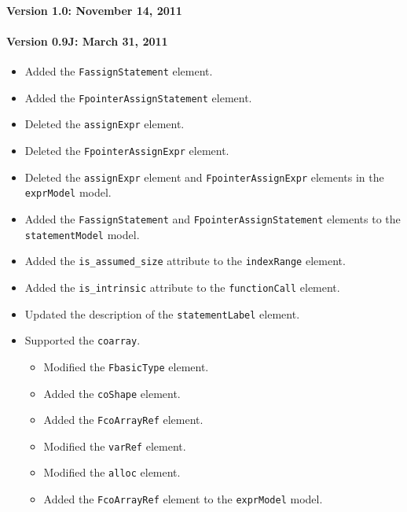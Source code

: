 \paragraph*{Version 1.0: November 14, 2011}

\paragraph*{Version 0.9J: March 31, 2011}

\begin{itemize}
  \item Added the {\tt FassignStatement} element.
  \item Added the {\tt FpointerAssignStatement} element.
  \item Deleted the {\tt assignExpr} element.
  \item Deleted the {\tt FpointerAssignExpr} element.
  \item Deleted the {\tt assignExpr} element and {\tt FpointerAssignExpr} elements in the {\tt exprModel} model.
  \item Added the {\tt FassignStatement} and {\tt FpointerAssignStatement} elements to the {\tt statementModel} model.
  \item Added the {\tt is\_assumed\_size} attribute to the {\tt indexRange} element.
  \item Added the {\tt is\_intrinsic} attribute to the {\tt functionCall} element.
  \item Updated the description of the {\tt statementLabel} element.
  \item Supported the {\tt coarray}.
  \begin{itemize}
    \item Modified the {\tt FbasicType} element.
    \item Added the {\tt coShape} element.
    \item Added the {\tt FcoArrayRef} element.
    \item Modified the {\tt varRef} element.
    \item Modified the {\tt alloc} element.
    \item Added the {\tt FcoArrayRef} element to the {\tt exprModel} model.
  \end{itemize}
\end{itemize}

